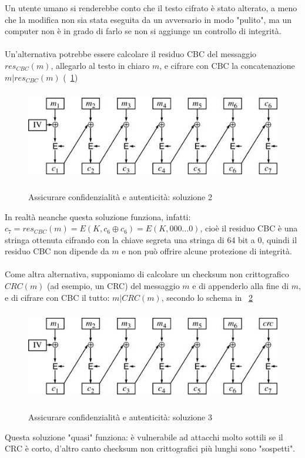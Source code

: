 Un utente umano si renderebbe conto che il testo cifrato è stato alterato, a meno che la modifica non sia stata eseguita da un avversario in modo "pulito", ma un computer non è in grado di farlo se non si
aggiunge un controllo di integrità.\\ \\
Un'alternativa potrebbe essere calcolare il residuo CBC del messaggio $res_{CBC}(m)$, allegarlo al testo in chiaro $m$, e cifrare con CBC la concatenazione $m|res_{CBC}(m)$ (\figurename ~\ref{fig:residuo_CBC_2})
\begin{figure}[htbp]
	\centering%
	\subfigure%
	{\includegraphics[height=4cm, width=12cm, keepaspectratio]{Immagini/Capitolo3/residuo_CBC_2.png}}
	\caption{Assicurare confidenzialità e autenticità: soluzione 2 \label{fig:residuo_CBC_2}} 	
\end{figure}
In realtà neanche questa soluzione funziona, infatti: $c_{7} = res_{CBC}(m) = E(K, c_{6} \oplus c_{6}) = E(K, 000 … 0)$, cioè il residuo CBC è una stringa ottenuta cifrando con la chiave segreta una stringa di 64 bit a 0, quindi il residuo CBC non dipende da $m$ e non può offrire alcune protezione di integrità.\\ \\
Come altra alternativa, supponiamo di calcolare un checksum non crittografico $CRC(m)$ (ad esempio, un CRC) del messaggio $m$ e di appenderlo alla fine di $m$, e di cifrare con CBC il tutto: $m| CRC(m)$, secondo lo schema in \figurename ~\ref{fig:residuo_CBC_3}
\begin{figure}[htbp]
	\centering%
	\subfigure%
	{\includegraphics[height=4cm, width=12cm, keepaspectratio]{Immagini/Capitolo3/residuo_CBC_3.png}}
	\caption{Assicurare confidenzialità e autenticità: soluzione 3 \label{fig:residuo_CBC_3}} 	
\end{figure}
Questa soluzione "quasi" funziona: è vulnerabile ad attacchi molto sottili se il CRC è corto, d'altro canto checksum non crittografici più lunghi sono "sospetti". \\ 
